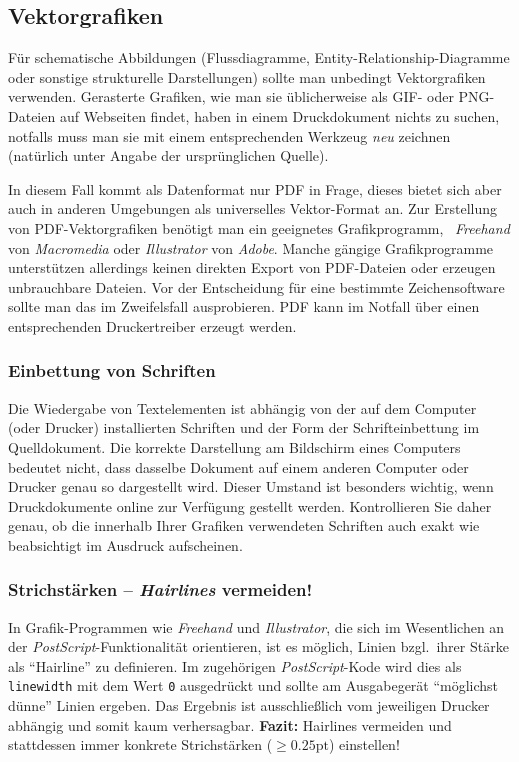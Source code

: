 \subsection{Vektorgrafiken}

Für schematische Abbildungen (\zB Flussdiagramme, Entity-Relationship-Diagramme
oder sonstige strukturelle Darstellungen) sollte man unbedingt
Vektorgrafiken verwenden.
Gerasterte Grafiken, wie man sie üblicherweise als GIF- oder PNG-Dateien
auf Webseiten findet, haben in einem Druckdokument nichts zu suchen, notfalls
muss man sie mit einem entsprechenden Werkzeug \emph{neu} zeichnen (natürlich
unter Angabe der ursprünglichen Quelle).

In diesem Fall kommt als Datenformat nur PDF in Frage,
dieses bietet sich aber auch in anderen Umgebungen als universelles
Vektor-Format an.
Zur Erstellung von PDF-Vektorgrafiken benötigt man ein geeignetes
Grafikprogramm, \zB\ \emph{Freehand} von \emph{Macromedia}
oder \emph{Illustrator} von \emph{Adobe}.
Manche gängige Grafikprogramme 
unterstützen allerdings keinen direkten Export von PDF-Dateien
oder erzeugen unbrauchbare Dateien. Vor der Entscheidung
für eine bestimmte Zeichensoftware sollte man das im Zweifelsfall
ausprobieren.
PDF kann im Notfall über einen entsprechenden Druckertreiber erzeugt werden.




\subsubsection{Einbettung von Schriften}

Die Wiedergabe von Textelementen ist abhängig von der auf dem
Computer (oder Drucker) installierten Schriften und der Form der
Schrifteinbettung im Quelldokument. Die korrekte Darstellung am
Bildschirm eines Computers bedeutet nicht, dass dasselbe Dokument
auf einem anderen Computer oder Drucker genau so dargestellt wird.
Dieser Umstand ist besonders wichtig, wenn Druckdokumente online
zur Verfügung gestellt werden. Kontrollieren Sie daher genau, ob
die innerhalb Ihrer Grafiken verwendeten Schriften auch exakt wie
beabsichtigt im Ausdruck aufscheinen.


\subsubsection{Strichstärken -- \emph{Hairlines} vermeiden!}

In Grafik-Programmen wie \emph{Freehand} und \emph{Illustrator},
die sich im Wesentlichen an der \emph{PostScript}-Funktionalität
orientieren, ist es möglich, Linien bzgl.\ ihrer Stärke als
"`Hairline"' zu definieren. Im zugehörigen \emph{PostScript}-Kode
wird dies als \texttt{linewidth} mit dem Wert \texttt{0} ausgedrückt und
sollte am Ausgabegerät "`möglichst dünne"' Linien ergeben. Das
Ergebnis ist ausschließlich vom jeweiligen Drucker
abhängig und somit kaum verhersagbar. 
\textbf{Fazit:} Hairlines vermeiden und stattdessen immer konkrete
Strichstärken ($\geq 0.25 \mathrm{pt}$) einstellen!


